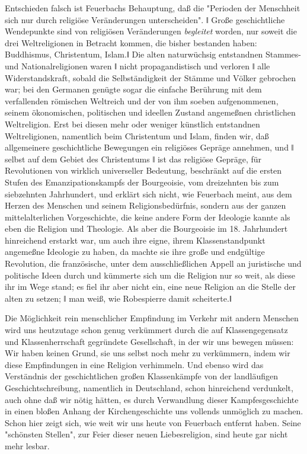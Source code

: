 Entschieden falsch ist Feuerbachs Behauptung, daß die "Perioden
der Menschheit sich nur durch religiöse Veränderungen unterscheiden". ǁ
Große geschichtliche Wendepunkte sind von religiösen
Veränderungen \emph{begleitet} worden, nur soweit die drei
Weltreligionen in Betracht kommen, die bisher bestanden haben:
Buddhismus, Christentum, Islam.ǁ Die alten naturwüchsig entstandnen
Stammes- und Nationalreligionen waren ǁ nicht propagandistisch und
verloren ǁ alle Widerstandskraft, sobald die Selbständigkeit der Stämme
und Völker gebrochen war; bei den Germanen genügte sogar die einfache
Berührung mit dem verfallenden römischen Weltreich und der von ihm
soeben aufgenommenen, seinem ökonomischen, politischen und ideellen
Zustand angemeßnen christlichen Weltreligion. Erst bei diesen mehr oder
weniger künstlich entstandnen Weltreligionen, namentlich beim
Christentum und Islam, finden wir, daß allgemeinere geschichtliche
Bewegungen ein religiöses Gepräge annehmen, und ǁ selbst auf dem Gebiet
des Christentums ǁ ist das religiöse Gepräge, für Revolutionen von
wirklich universeller Bedeutung, beschränkt auf die ersten Stufen des
Emanzipationskampfs der Bourgeoisie, vom dreizehnten bis zum siebzehnten
Jahrhundert, und erklärt sich nicht, wie Feuerbach meint, aus dem Herzen
des Menschen und seinem Religionsbedürfnis, sondern aus der ganzen
mittelalterlichen Vorgeschichte, die keine andere Form der Ideologie
kannte als eben die Religion und Theologie. Als aber die Bourgeoisie im
18. Jahrhundert hinreichend erstarkt war, um auch ihre eigne, ihrem
Klassenstandpunkt angemeßne Ideologie zu haben, da machte sie ihre große
und endgültige Revolution, die französische, unter dem ausschließlichen
Appell an juristische und politische Ideen durch und kümmerte sich um
die Religion nur so weit, als diese ihr im Wege stand; es fiel ihr aber
nicht ein, eine neue Religion an die Stelle der alten zu setzen; ǁ man
weiß, wie Robespierre damit scheiterte.ǁ

Die Möglichkeit rein menschlicher Empfindung im Verkehr mit
andern Menschen wird uns heutzutage schon genug verkümmert durch die auf
Klassengegensatz und Klassenherrschaft gegründete Gesellschaft, in der
wir uns bewegen müssen: Wir haben keinen Grund, sie uns selbst noch mehr
zu verkümmern, indem wir diese Empfindungen in eine Religion verhimmeln.
Und ebenso wird das Verständnis der geschichtlichen großen Klassenkämpfe
von der landläufigen Geschichtschreibung, namentlich in Deutschland,
schon hinreichend verdunkelt, auch ohne daß wir nötig hätten, es durch
Verwandlung dieser Kampfesgeschichte in einen bloßen Anhang der
Kirchengeschichte uns vollends unmöglich zu machen. Schon hier zeigt
sich, wie weit wir uns heute von Feuerbach entfernt haben. Seine
"schönsten Stellen", zur Feier dieser neuen Liebesreligion, sind heute
gar nicht mehr lesbar.

